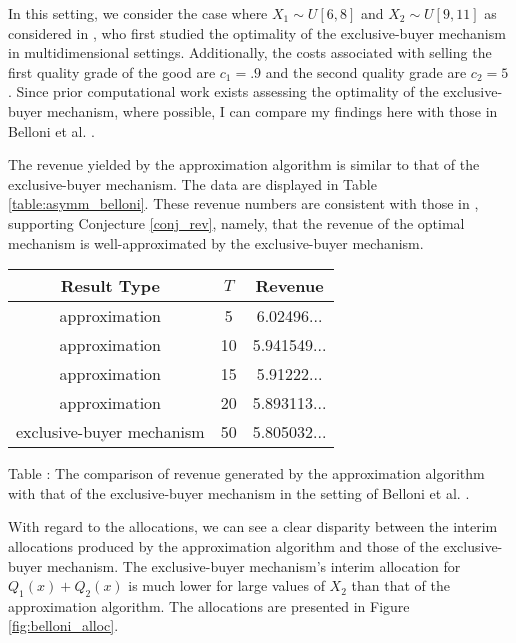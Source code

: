 In this setting, we consider the case where $X_1 \sim U[6,8]$ and $X_2 \sim U[9,11]$ as considered in \autocite{belloni2010multidimensional}, who first studied the optimality of the exclusive-buyer mechanism in multidimensional settings. Additionally, the costs associated with selling the first quality grade of the good are $c_1 = .9$ and the second quality grade are $c_2 = 5$. Since prior computational work exists assessing the optimality of the exclusive-buyer mechanism, where possible, I can compare my findings here with those in Belloni et al. \autocite*{belloni2010multidimensional}. 

The revenue yielded by the approximation algorithm is similar to that of the exclusive-buyer mechanism. The data are displayed in Table \ref{table:asymm_belloni}. These revenue numbers are consistent with those in \autocite[Table 3]{belloni2010multidimensional}, supporting Conjecture \ref{conj_rev}, namely, that the revenue of the optimal mechanism is well-approximated by the exclusive-buyer mechanism.

\begin{center}
    \begin{tabular}{ |c|c|c| } 
    \hline
    Result Type & $T$ & Revenue \\
    \hline
    \hline
    approximation & 5 & 6.02496... \\ 
    approximation & 10 & 5.941549... \\ 
    approximation & 15 & 5.91222... \\ 
    approximation & 20 & 5.893113... \\ 
    exclusive-buyer mechanism & 50 & 5.805032... \\
    \hline
    \end{tabular}

    \vspace{1mm}
    \raggedright{\small {\sc Table \thefig\label{table:asymm_belloni}:} The comparison of revenue generated by the approximation algorithm with that of the exclusive-buyer mechanism in the setting of Belloni et al. \autocite*{belloni2010multidimensional}.}
\end{center}

With regard to the allocations, we can see a clear disparity between the interim allocations produced by the approximation algorithm and those of the exclusive-buyer mechanism. The exclusive-buyer mechanism's interim allocation for $Q_1(x) + Q_2(x)$ is much lower for large values of $X_2$ than that of the approximation algorithm. The allocations are presented in Figure \ref{fig:belloni_alloc}.

